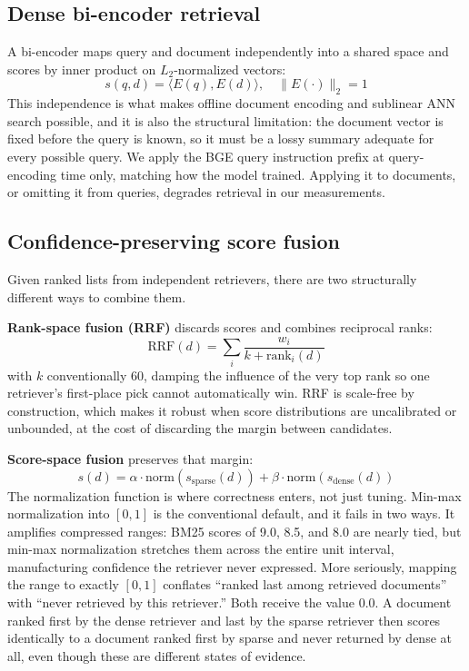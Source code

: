 \documentclass[11pt]{article}
\begin{document}
\subsection{Dense bi-encoder retrieval}

A bi-encoder maps query and document independently into a shared space and scores by inner product on $L_2$-normalized vectors:
\begin{equation}
s(q,d) = \langle E(q), E(d)\rangle, \quad \|E(\cdot)\|_2 = 1
\end{equation}
This independence is what makes offline document encoding and sublinear ANN search possible, and it is also the structural limitation: the document vector is fixed before the query is known, so it must be a lossy summary adequate for every possible query. We apply the BGE query instruction prefix at query-encoding time only, matching how the model trained. Applying it to documents, or omitting it from queries, degrades retrieval in our measurements.

\subsection{Confidence-preserving score fusion}
\label{sec:fusion-method}

Given ranked lists from independent retrievers, there are two structurally different ways to combine them.

\textbf{Rank-space fusion (RRF)} discards scores and combines reciprocal ranks:
\begin{equation}
\text{RRF}(d) = \sum_i \frac{w_i}{k + \text{rank}_i(d)}
\end{equation}
with $k$ conventionally 60, damping the influence of the very top rank so one retriever's first-place pick cannot automatically win. RRF is scale-free by construction, which makes it robust when score distributions are uncalibrated or unbounded, at the cost of discarding the margin between candidates.

\textbf{Score-space fusion} preserves that margin:
\begin{equation}
s(d) = \alpha \cdot \text{norm}(s_{\text{sparse}}(d)) + \beta \cdot \text{norm}(s_{\text{dense}}(d))
\end{equation}
The normalization function is where correctness enters, not just tuning. Min-max normalization into $[0,1]$ is the conventional default, and it fails in two ways. It amplifies compressed ranges: BM25 scores of 9.0, 8.5, and 8.0 are nearly tied, but min-max normalization stretches them across the entire unit interval, manufacturing confidence the retriever never expressed. More seriously, mapping the range to exactly $[0,1]$ conflates ``ranked last among retrieved documents'' with ``never retrieved by this retriever.'' Both receive the value 0.0. A document ranked first by the dense retriever and last by the sparse retriever then scores identically to a document ranked first by sparse and never returned by dense at all, even though these are different states of evidence.
\end{document}
